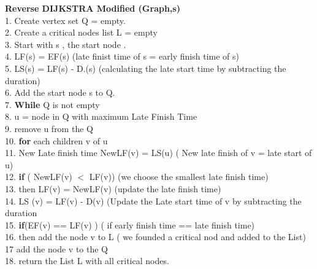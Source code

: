 \documentclass[10 pt]{article}
\begin{document}
\textbf{ Reverse DIJKSTRA Modified  (Graph,s)}\\
1. Create vertex set Q  = empty.\\ 
2. Create a critical nodes list L = empty \\
3. Start with s , the start node .\\
4. LF(s) = EF(s) (late finist time of s = early finish time of s) \\ 
5. LS(s) = LF(s) - D.(s)  (calculating the late start time by subtracting the duration)\\
6. Add the start node s to Q.\\
7. \textbf{While} Q is not empty \\
8. \indent u =  node in Q with maximum Late Finish Time\\
9. \indent remove u from the Q\\
10. \indent  \textbf{for} each children v of u \\
11. \indent \indent  New Late finish time  NewLF(v) = LS(u)    ( New late finish  of v  = late start  of u) \\
12. \indent \indent \textbf{if} ( NewLF(v) $ < $ LF(v)) (we choose the smallest late finish time)\\
13. \indent \indent \indent then LF(v) = NewLF(v) (update the late finish time)\\
14. \indent \indent  LS (v) = LF(v) - D(v) (Update  the Late start time  of v by subtracting the duration\\
15. \indent \indent \textbf{if}(EF(v) == LF(v) ) ( if early finish time == late finish time)\\
16. \indent \indent \indent then add the node v to L ( we founded a critical nod and added to the List)\\
17 \indent \indent add the node v to the Q\\
18. return the List L with all critical nodes.\\
\end{document}
